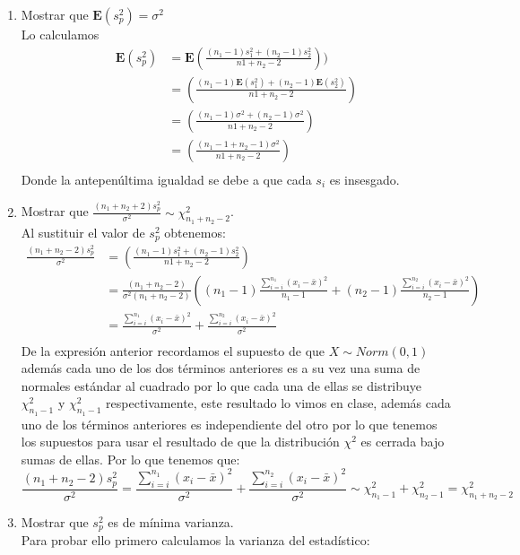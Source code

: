 \documentclass[letter]{memoir} %
\begin{document}
\begin{enumerate}
\begin{enumerate}
\item Mostrar que $\mathbf{E}(s_p^2) = \sigma^2$\\
Lo calculamos 
\[
\begin{split}
\mathbf{E} (s_p^2) & =\mathbf{E}\left(\frac{(n_1-1)s_1^2 +(n_2-1)s_2^2}{n1+n_2-2}\right))\\
& =\left(\frac{(n_1-1)\mathbf{E}(s_1^2) +(n_2-1)\mathbf{E}(s_2^2)}{n1+n_2-2}\right)\\
& =\left(\frac{(n_1-1) \sigma^2  +(n_2-1) \sigma^2 }{n1+n_2-2}\right)\\
& =\left(\frac{(n_1-1  +n_2-1) \sigma^2 }{n1+n_2-2}\right)\\
\end{split}
\]
Donde la antepenúltima igualdad se debe a que cada $s_i$ es insesgado.\\
\item Mostrar que $\frac{(n_1+n_2+2)s_p^2}{\sigma^2} \sim \chi_{n_1+n_2-2}^2 $.\\
Al sustituir el valor de $s_p^2$ obtenemos:
\[
\begin{split}
\frac{ (n_1+n_2-2)s_p^2}{\sigma^2} & = \left(\frac{(n_1-1)s_1^2 +(n_2-1)s_2^2}{n1+n_2-2}\right)\\
&  = \frac{(n_1+n_2-2)}{\sigma^2 (n_1+n_2-2)} \left( (n_1-1)\frac{\sum_{i=i}^{n_1}(x_i-\bar{x})^2 }{n_1-1} + (n_2-1)\frac{\sum_{i=i}^{n_2}(x_i-\bar{x})^2 }{n_2-1} \right) \\
& = \frac{\sum_{i=i}^{n_1}(x_i-\bar{x})^2 }{\sigma^2} +  \frac{\sum_{i=i}^{n_2}(x_i-\bar{x})^2 }{\sigma^2}\\
\end{split}
\]
De la expresión anterior recordamos el supuesto de que $X \sim Norm(0,1)$ además cada uno de los dos términos anteriores es a su vez una suma de normales estándar al cuadrado por lo que cada una de ellas se distribuye $\chi_{n_1-1}^2$ y $\chi_{n_1-1}^2$ respectivamente, este resultado lo vimos en clase, además cada uno de los términos anteriores es independiente del otro por lo que tenemos los supuestos para usar el resultado de que la distribución $\chi^2$ es cerrada bajo sumas de ellas. Por lo que tenemos que:   
\[
\frac{ (n_1+n_2-2)s_p^2}{\sigma^2}  = \frac{\sum_{i=i}^{n_1}(x_i-\bar{x})^2 }{\sigma^2} +  \frac{\sum_{i=i}^{n_2}(x_i-\bar{x})^2 }{\sigma^2} \sim \chi_{n_1-1}^2 + \chi_{n_2-1}^2 = \chi_{n_1 + n_2-2}^2 
\]
\item Mostrar que $s_p^2$ es de mínima varianza.\\
Para probar ello primero calculamos la varianza del estadístico:

\end{enumerate}
\end{enumerate}
\end{document}
